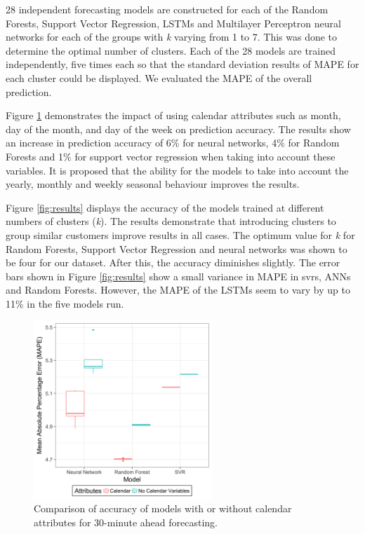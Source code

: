 28 independent forecasting models are constructed for each of the Random Forests, Support Vector Regression, LSTMs and Multilayer Perceptron neural networks for each of the groups with \textit{k} varying from 1 to 7. This was done to determine the optimal number of clusters.  Each of the 28 models are trained independently, five times each so that the standard deviation results of MAPE for each cluster could be displayed. We evaluated the MAPE of the overall prediction. 

Figure \ref{fig:calendar_attr} demonstrates the impact of using calendar attributes such as month, day of the month, and day of the week on prediction accuracy. The results show an increase in prediction accuracy of 6\% for neural networks, 4\% for Random Forests and 1\% for support vector regression when taking into account these variables. It is proposed that the ability for the models to take into account the yearly, monthly and weekly seasonal behaviour improves the results.

Figure \ref{fig:results} displays the accuracy of the models trained at different numbers of clusters (\textit{k}). The results demonstrate that introducing clusters to group similar customers improve results in all cases. The optimum value for \textit{k} for Random Forests, Support Vector Regression and neural networks was shown to be four for our dataset. After this, the accuracy diminishes slightly. The error bars shown in Figure \ref{fig:results} show a small variance in MAPE in \acrshort{svr}s, ANNs and Random Forests. However, the MAPE of the LSTMs seem to vary by up to 11\% in the five models run. 


\begin{figure}
	\centering
	\includegraphics[width=0.6\textwidth]{Chapter5/figures/short-term-forecasting/calendar_attr.png}
	\caption{Comparison of accuracy of models with or without calendar attributes for 30-minute ahead forecasting.}
	\label{fig:calendar_attr}
\end{figure}



